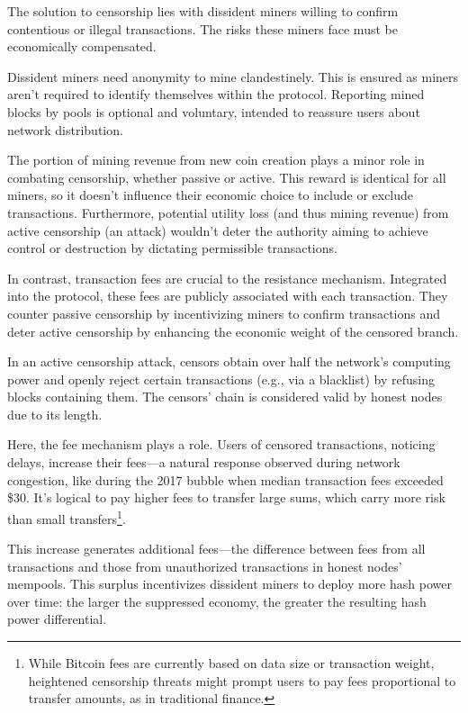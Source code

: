 \documentclass[
  a5paper,
  smalldemyvopaper,10pt,twoside,onecolumn,openright,extrafontsizes,hidelinks]{memoir}
\begin{document}
The solution to censorship lies with dissident miners willing to confirm
contentious or illegal transactions. The risks these miners face must be
economically compensated.

Dissident miners need anonymity to mine clandestinely. This is ensured
as miners aren't required to identify themselves within the protocol.
Reporting mined blocks by pools is optional and voluntary, intended to
reassure users about network distribution.

The portion of mining revenue from new coin creation plays a minor role
in combating censorship, whether passive or active. This reward is
identical for all miners, so it doesn't influence their economic choice
to include or exclude transactions. Furthermore, potential utility loss
(and thus mining revenue) from active censorship (an attack) wouldn't
deter the authority aiming to achieve control or destruction by
dictating permissible transactions.

In contrast, transaction fees are crucial to the resistance mechanism.
Integrated into the protocol, these fees are publicly associated with
each transaction. They counter passive censorship by incentivizing
miners to confirm transactions and deter active censorship by enhancing
the economic weight of the censored branch.

In an active censorship attack, censors obtain over half the network's
computing power and openly reject certain transactions (e.g., via a
blacklist) by refusing blocks containing them. The censors' chain is
considered valid by honest nodes due to its length.

Here, the fee mechanism plays a role. Users of censored transactions,
noticing delays, increase their fees---a natural response observed
during network congestion, like during the 2017 bubble when median
transaction fees exceeded \$30. It's logical to pay higher fees to
transfer large sums, which carry more risk than small
transfers\footnote{While Bitcoin fees are currently based on data size
  or transaction weight, heightened censorship threats might prompt
  users to pay fees proportional to transfer amounts, as in traditional
  finance.}.

This increase generates additional fees---the difference between fees
from all transactions and those from unauthorized transactions in honest
nodes' mempools. This surplus incentivizes dissident miners to deploy
more hash power over time: the larger the suppressed economy, the
greater the resulting hash power differential.
\end{document}
